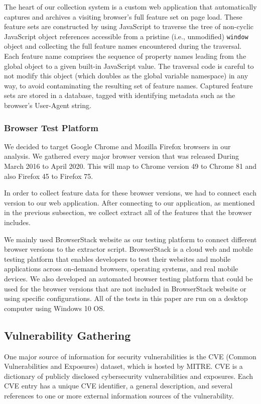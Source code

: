 The heart of our collection system is a custom web application that automatically captures and archives a visiting browser's full feature set on page load.
These feature sets are constructed by using JavaScript to traverse the tree of non-cyclic JavaScript object references accessible from a pristine (i.e., unmodified) \texttt{window} object and collecting the full feature names encountered during the traversal.
Each feature name comprises the sequence of property names leading from the global object to a given built-in JavaScript value.
The traversal code is careful to not modify this object (which doubles as the global variable namespace) in any way, to avoid contaminating the resulting set of feature names.
Captured feature sets are stored in a database, tagged with identifying metadata such as the browser's User-Agent string.

\subsubsection{Browser Test Platform}

We decided to target Google Chrome and Mozilla Firefox browsers in our analysis. We gathered every major browser version that was released During March 2016 to April 2020. This will map to Chrome version 49 to Chrome 81 and also Firefox 45 to Firefox 75.

In order to collect feature data for these browser versions, we had to connect each version to our web application. After connecting to our application, as mentioned in the previous subsection, we collect extract all of the features that the browser includes.

We mainly used BrowserStack website as our testing platform to connect different browser versions to the extractor script. BrowserStack is a cloud web and mobile testing platform that enables developers to test their websites and mobile applications across on-demand browsers, operating systems, and real mobile devices. We also developed an automated browser testing platform that could be used for the browser versions that are not included in BrowserStack website or using specific configurations.
All of the tests in this paper are run on a desktop computer using Windows 10 OS.

\subsection{Vulnerability Gathering}
One major source of information for security vulnerabilities is the CVE (Common Vulnerabilities and Exposures) dataset,
which is hosted by MITRE. CVE is a dictionary of publicly disclosed cybersecurity vulnerabilities and exposures. Each CVE entry
has a unique CVE identifier, a general description, and several references to one or more external information sources of
the vulnerability.

